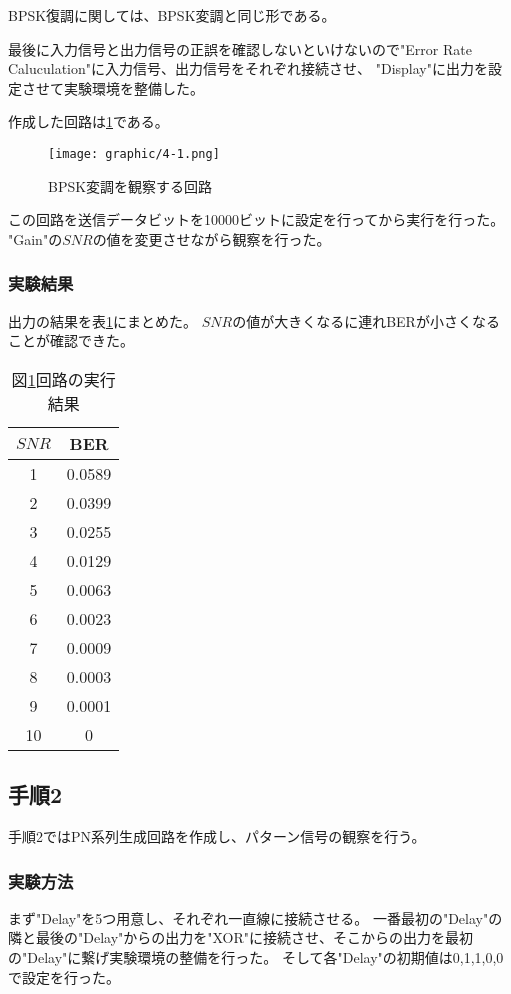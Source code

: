 \documentclass[dvipdfmx]{jsarticle}
\begin{document}
BPSK復調に関しては、BPSK変調と同じ形である。

最後に入力信号と出力信号の正誤を確認しないといけないので"Error Rate Caluculation"に入力信号、出力信号をそれぞれ接続させ、
"Display"に出力を設定させて実験環境を整備した。

作成した回路は\ref*{fig:4-1}である。
\begin{figure}[H]
  \begin{center}
    \texttt{[image: graphic/4-1.png]}
  \end{center}
  \caption[]{BPSK変調を観察する回路}
  \label{fig:4-1}
\end{figure}

この回路を送信データビットを10000ビットに設定を行ってから実行を行った。
"Gain"の$SNR$の値を変更させながら観察を行った。

\subsubsection{実験結果}
出力の結果を表\ref{tb:1}にまとめた。
$SNR$の値が大きくなるに連れBERが小さくなることが確認できた。
\begin{table}[H]
  \caption{図\ref*{fig:4-1}回路の実行結果}
  \centering
  \begin{tabular}{|c|c|}\hline
    $SNR$ & BER \\ \hline
    1 & 0.0589 \\ \hline
    2 & 0.0399 \\ \hline
    3 & 0.0255 \\ \hline
    4 & 0.0129 \\ \hline
    5 & 0.0063 \\ \hline
    6 & 0.0023 \\ \hline
    7 & 0.0009 \\ \hline
    8 & 0.0003 \\ \hline
    9 & 0.0001 \\ \hline
    10 & 0 \\ \hline
  \end{tabular}
  \label{tb:1}
\end{table}

\subsection{手順2}
手順2ではPN系列生成回路を作成し、パターン信号の観察を行う。

\subsubsection{実験方法}
まず"Delay"を5つ用意し、それぞれ一直線に接続させる。
一番最初の"Delay"の隣と最後の"Delay"からの出力を"XOR"に接続させ、そこからの出力を最初の"Delay"に繋げ実験環境の整備を行った。
そして各"Delay"の初期値は0,1,1,0,0で設定を行った。
\end{document}
